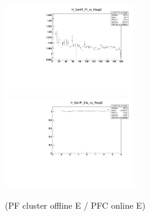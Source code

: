



\begin{figure}
\includegraphics[width=0.495\textwidth]{./plots_pdf/ECAL_plots/Prod6/NoPU/H_GenPi_Pt_vs_RespE.pdf}
\includegraphics[width=0.495\textwidth]{./plots_pdf/ECAL_plots/Prod6/NoPU/H_GenPi_Eta_vs_RespE.pdf}
\caption{(PF cluster offline E / PFC online E)}
\end{figure}

